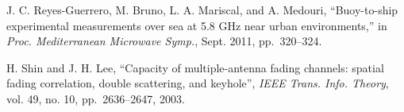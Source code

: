 \documentclass[conference]{IEEEtran}
\begin{document}
\begin{thebibliography}{10}
 J. C. Reyes-Guerrero, M. Bruno, L. A. Mariscal, and A. Medouri, ``Buoy-to-ship experimental measurements over sea at 5.8 GHz near urban environments,'' in
 \emph{Proc. Mediterranean Microwave Symp.}, Sept. 2011, pp.~320--324.
 
 
 
  H. Shin and J. H. Lee, ``Capacity of multiple-antenna fading channels: spatial fading correlation, double scattering, and keyhole'',
  \emph{IEEE Trans. Info. Theory}, vol. 49, no. 10, pp.~2636--2647, 2003.
 
 
 
 
 
 
 \end{thebibliography}
 
 
 
\end{document}
